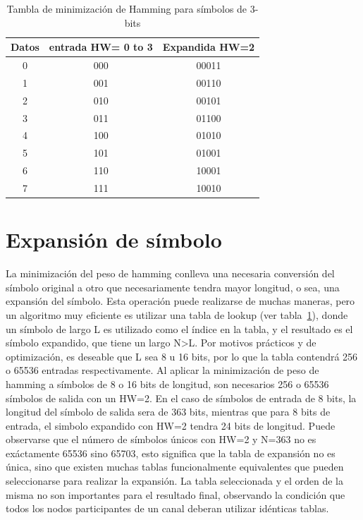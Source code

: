 \begin{table}[t]
\begin{center}
\begin{tabular}{c c c}
Datos & entrada HW= 0 to 3 & Expandida HW=2\\
\hline\hline
0 & 000 & 00011\\
1 & 001 & 00110\\
2 & 010 & 00101\\
3 & 011 & 01100\\
4 & 100 & 01010\\
5 & 101 & 01001\\
6 & 110 & 10001\\
7 & 111 & 10010\\
\end{tabular}
\caption{Tambla de minimización de Hamming para símbolos de 3-bits}
\label{hwtable}
\end{center}
 \end{table}
 
\section{Expansión de símbolo}
La minimización del peso de hamming conlleva una necesaria conversión del símbolo original a otro que necesariamente tendra mayor longitud, o sea, una expansión del símbolo.
Esta operación puede realizarse de muchas maneras, pero un algoritmo muy eficiente es utilizar una tabla de lookup (ver tabla~\ref{hwtable}), donde un símbolo de largo L es utilizado como el índice en la tabla, y el resultado es el símbolo expandido, que tiene un largo N\textgreater L.
Por motivos prácticos y de optimización, es deseable que L sea 8 u 16 bits, por lo que la tabla contendrá 256 o 65536 entradas respectivamente.
Al aplicar la minimización de peso de hamming a símbolos de 8 o 16 bits de longitud, son necesarios 256 o 65536 símbolos de salida con un HW=2. En el caso de símbolos de entrada de 8 bits, la longitud del símbolo de salida sera de 363 bits, mientras que para 8 bits de entrada, el simbolo expandido con HW=2 tendra 24 bits de longitud.
Puede observarse que el número de símbolos únicos con HW=2 y N=363 no es exáctamente 65536 sino 65703, esto significa que la tabla de expansión no es única, sino que existen muchas tablas funcionalmente equivalentes que pueden seleccionarse para realizar la expansión.
La tabla seleccionada y el orden de la misma no son importantes para el resultado final, observando la condición que todos los nodos participantes de un canal deberan utilizar idénticas tablas.


